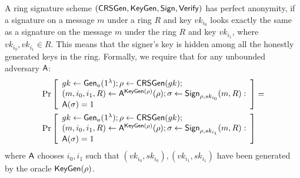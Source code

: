 \begin{definition}
A ring signature scheme
$(\mathsf{CRSGen},\allowbreak \mathsf{KeyGen},\allowbreak \mathsf{Sign}, \mathsf{Verify})$ has perfect anonymity, if a signature on a message
$m$ under a ring $R$ and key $vk_{i_0}$
looks exactly the same as a signature on the
message $m$ under the ring $R$ and key $vk_{i_1}$, where $vk_{i_0},vk_{i_1}\in R$. This means that the signer's key is hidden
among all the honestly generated keys in the ring. Formally, we require that for any unbounded
adversary $\mathsf{A}$:
\begin{align*}
&\Pr\left[\begin{array}{l}
gk\gets\mathsf{Gen}_a(1^\lambda);\rho\gets\mathsf{CRSGen}(gk);\\
(m,i_0,i_1,R)\gets\mathsf{A}^{\mathsf{KeyGen}(\rho)}(\rho);\sigma\gets\mathsf{Sign}_{\rho,sk_{i_0}}(m,R):\\
\mathsf{A}(\sigma)=1
\end{array}\right]
=\\
&\Pr\left[\begin{array}{l}
gk\gets\mathsf{Gen}_a(1^\lambda);\rho\gets\mathsf{CRSGen}(gk);\\
(m,i_0,i_1,R)\gets\mathsf{A}^{\mathsf{KeyGen}(\rho)}(\rho);\sigma\gets\mathsf{Sign}_{\rho,sk_{i_1}}(m,R):\\
\mathsf{A}(\sigma)=1
\end{array}\right]
\end{align*}
where $\mathsf{A}$ chooses $i_0, i_1$ such that $(vk_{i_0}, sk_{i_0}),(vk_{i_1}, sk_{i_1})$ have been generated by the
oracle $\mathsf{KeyGen}(\rho)$.
\end{definition}

